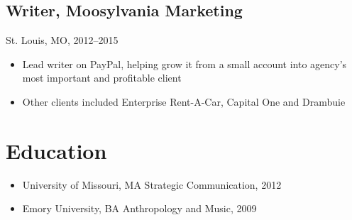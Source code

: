 \documentclass[11pt]{article}
\begin{document}
	\subsection{\normalsize{Writer, Moosylvania Marketing}}
	{\fontsize{10pt}{\parskip}\selectfont St. Louis, MO, 2012--2015}
	\begin{itemize}
		\item Lead writer on PayPal, helping grow it from a small account into agency\rq s most important and profitable client
		\item Other clients included Enterprise Rent-A-Car, Capital One and Drambuie
	\end{itemize}
	
	\section{Education}
		\begin{itemize}
			\item University of Missouri, MA Strategic Communication, 2012
			\item Emory University, BA Anthropology and Music, 2009
					
				
		\end{itemize}
	
\end{document}
